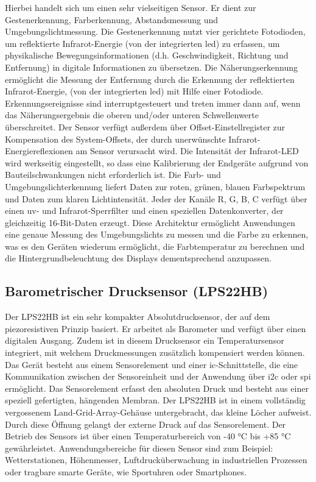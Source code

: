 Hierbei handelt sich um einen sehr vielseitigen Sensor. Er dient zur Gestenerkennung, Farberkennung, Abstandsmessung und Umgebungslichtmessung. Die Gestenerkennung nutzt vier gerichtete Fotodioden, um reflektierte Infrarot-Energie (von der integrierten \ac{led}) zu erfassen, um physikalische Bewegungsinformationen (d.h. Geschwindigkeit, Richtung und Entfernung) in digitale Informationen zu übersetzen. Die Näherungserkennung ermöglicht die Messung der Entfernung durch die Erkennung der reflektierten Infrarot-Energie, (von der integrierten \ac{led}) mit Hilfe einer Fotodiode. Erkennungsereignisse sind interruptgesteuert und treten immer dann auf, wenn das Näherungsergebnis die oberen und/oder unteren Schwellenwerte überschreitet. Der Sensor verfügt außerdem über Offset-Einstellregister zur Kompensation des System-Offsets, der durch unerwünschte Infrarot-Energiereflexionen am Sensor verursacht wird. Die Intensität der Infrarot-LED wird werkseitig eingestellt, so dass eine Kalibrierung der Endgeräte aufgrund von Bauteilschwankungen nicht erforderlich ist. Die Farb- und Umgebungslichterkennung liefert Daten zur roten, grünen, blauen Farbspektrum und Daten zum klaren Lichtintensität. Jeder der Kanäle R, G, B, C verfügt über einen \ac{uv}- und Infrarot-Sperrfilter und einen speziellen Datenkonverter, der gleichzeitig 16-Bit-Daten erzeugt. Diese Architektur ermöglicht Anwendungen eine genaue Messung des Umgebungslichts zu messen und die Farbe zu erkennen, was es den Geräten wiederum ermöglicht, die Farbtemperatur zu berechnen und die Hintergrundbeleuchtung des Displays dementsprechend anzupassen.\cite{AT.2015}\cite{Ard.2024}
	
\subsection{Barometrischer Drucksensor (LPS22HB)}

Der LPS22HB ist ein sehr kompakter Absolutdrucksensor, der auf dem piezoresistiven Prinzip basiert. Er arbeitet als Barometer und verfügt über einen digitalen Ausgang. Zudem ist in diesem Drucksensor ein Temperatursensor integriert, mit welchem Druckmessungen zusätzlich kompensiert werden können. Das Gerät besteht aus einem Sensorelement und einer \ac{ic}-Schnittstelle, die eine Kommunikation zwischen der Sensoreinheit und der Anwendung über \ac{i2c} oder \ac{spi} ermöglicht. Das Sensorelement erfasst den absoluten Druck und besteht aus einer speziell gefertigten, hängenden Membran. Der LPS22HB ist in einem vollständig vergossenem Land-Grid-Array-Gehäuse untergebracht, das kleine Löcher aufweist. Durch diese Öffnung gelangt der externe Druck auf das Sensorelement. Der Betrieb des Sensors ist über einen Temperaturbereich von -40 °C bis +85 °C gewährleistet. \cite{STM2.2017}\cite{Ard.2024}
Anwendungsbereiche für diesen Sensor sind zum Beispiel: Wetterstationen, Höhenmesser, Luftdrucküberwachung in industriellen Prozessen oder tragbare smarte Geräte, wie Sportuhren oder Smartphones.
	

